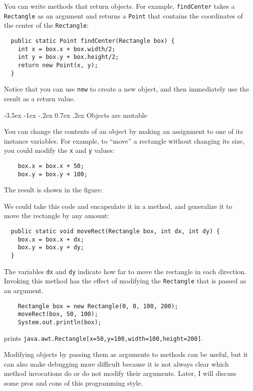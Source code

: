 \documentclass{book}
\makeatletter
\renewcommand{\section}{\@startsection 
    {section} {1} {0mm}%
    {-3.5ex \@plus -1ex \@minus -.2ex}%
    {0.7ex \@plus.2ex}%
    {\normalfont\Large\bfseries}}
\newcommand{\beforefig}{\vspace{1.3\parskip}}
\newcommand{\afterfig}{\vspace{-0.2\parskip}}
\newcommand{\myfig}[1]{
    \beforefig
    \centerline{\epsfig{#1,scale=0.8}}
    \afterfig
}
\makeatother
\begin{document}
You can write methods that return objects.  For example,
{\tt findCenter} takes a {\tt Rectangle} as an argument and
returns a {\tt Point} that contains the coordinates of the
center of the {\tt Rectangle}:

\begin{verbatim}
  public static Point findCenter(Rectangle box) {
    int x = box.x + box.width/2;
    int y = box.y + box.height/2;
    return new Point(x, y);
  }
\end{verbatim}
%
Notice that you can use {\tt new} to create a new object,
and then immediately use the result as a return value.

\section{Objects are mutable}

You can change the contents of an object by making an assignment
to one of its instance variables.  For example, to ``move''
a rectangle without changing its size, you could modify the
{\tt x} and {\tt y} values:

\begin{verbatim}
    box.x = box.x + 50;
    box.y = box.y + 100;
\end{verbatim}
%
The result is shown in the figure:


\myfig{figure=figs/rectangle2.eps}



We could take this code and encapsulate it in a method, and
generalize it to move the rectangle by any amount:

\begin{verbatim}
  public static void moveRect(Rectangle box, int dx, int dy) {
    box.x = box.x + dx;
    box.y = box.y + dy;
  }
\end{verbatim}
%
The variables {\tt dx} and {\tt dy} indicate how far to move the
rectangle in each direction.  Invoking this method has the effect of
modifying the {\tt Rectangle} that is passed as an argument.

\begin{verbatim}
    Rectangle box = new Rectangle(0, 0, 100, 200);
    moveRect(box, 50, 100);
    System.out.println(box);
\end{verbatim}
%
prints {\tt java.awt.Rectangle[x=50,y=100,width=100,height=200]}.

Modifying objects by passing them as arguments to methods can be
useful, but it can also make debugging more difficult because it is
not always clear which method invocations do or do not modify their
arguments.  Later, I will discuss some pros and cons of this
programming style.
\end{document}
